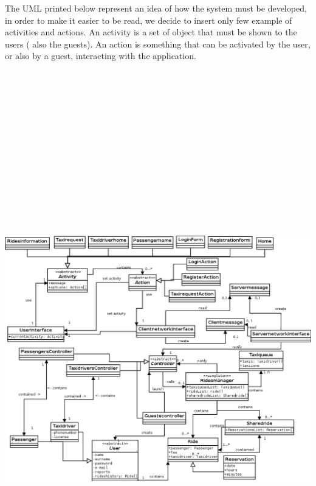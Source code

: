 The UML printed below represent an idea of how the system must be developed, in order to make it easier to be read,
we decide to insert only few example of activities and actions.
An activity is a set of object that must be shown to the users ( also the guests).
An action is something that can be activated by the user, or also by a guest, interacting with the application.
\begin{center}
\hspace*{-2cm}
 \includegraphics[height=25cm, width=18cm]{UML/Diagramma1.png}
\end{center}
